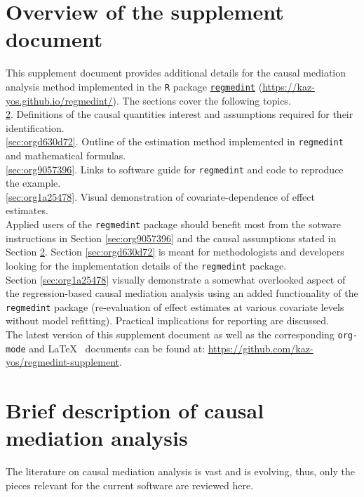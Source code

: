 \documentclass[10pt]{article}
\date{\today}
\title{}
\begin{document}
\tableofcontents

\sloppy
\setcounter{page}{0}
\newpage
\setcounter{section}{-1}
\section{Overview of the supplement document}
\label{sec:org602d877}

This supplement document provides additional details for the causal mediation analysis method implemented in the \texttt{R} package \href{https://kaz-yos.github.io/regmedint/}{\texttt{regmedint}} (\url{https://kaz-yos.github.io/regmedint/}). The sections cover the following topics.\\

\ref{sec:orge2143ec}. Definitions of the causal quantities interest and assumptions required for their identification.\\
\ref{sec:orgd630d72}. Outline of the estimation method implemented in \texttt{regmedint} and mathematical formulas.\\
\ref{sec:org9057396}. Links to software guide for \texttt{regmedint} and code to reproduce the example.\\
\ref{sec:org1a25478}. Visual demonstration of covariate-dependence of effect estimates.\\

Applied users of the \texttt{regmedint} package should benefit most from the sotware instructions in Section \ref{sec:org9057396} and the causal assumptions stated in Section \ref{sec:orge2143ec}. Section \ref{sec:orgd630d72} is meant for methodologists and developers looking for the implementation details of the \texttt{regmedint} package.\\

Section \ref{sec:org1a25478} visually demonstrate a somewhat overlooked aspect of the regression-based causal mediation analysis using an added functionality of the \texttt{regmedint} package (re-evaluation of effect estimates at various covariate levels without model refitting). Practical implications for reporting are discussed.\\

The latest version of this supplement document as well as the corresponding \texttt{org-mode} and \LaTeX ~ documents can be found at: \url{https://github.com/kaz-yos/regmedint-supplement}.


\section{Brief description of causal mediation analysis}
\label{sec:orge2143ec}
The literature on causal mediation analysis is vast \cite{vanderweeleExplanationCausalInference2015} and is evolving, thus, only the pieces relevant for the current software are reviewed here.
\end{document}
